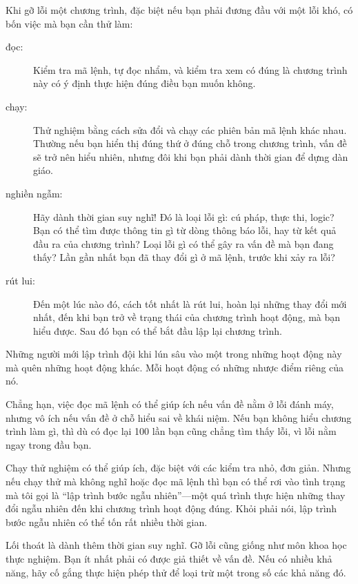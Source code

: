 \documentclass[12pt]{book}
\begin{document}
Khi gỡ lỗi một chương trình, đặc biệt nếu bạn phải đương đầu với
một lỗi khó, có bốn việc mà bạn cần thử làm:

\begin{description}

\item[đọc:] Kiểm tra mã lệnh, tự đọc nhẩm, và kiểm tra xem có đúng
là chương trình này có ý định thực hiện đúng điều bạn muốn không.

\item[chạy:] Thử nghiệm bằng cách sửa đổi và chạy các phiên bản mã lệnh
khác nhau. Thường nếu bạn hiển thị đúng thứ ở đúng chỗ trong chương
trình, vấn đề sẽ trở nên hiểu nhiên, nhưng đôi khi bạn phải dành 
thời gian để dựng dàn giáo.

\item[nghiền ngẫm:] Hãy dành thời gian suy nghĩ! Đó là loại lỗi gì:
cú pháp, thực thi, logic? Bạn có thể tìm được thông tin gì từ dòng
thông báo lỗi, hay từ kết quả đầu ra của chương trình? Loại lỗi gì
có thể gây ra vấn đề mà bạn đang thấy? Lần gần nhất bạn đã thay đổi
gì ở mã lệnh, trước khi xảy ra lỗi?

\item[rút lui:] Đến một lúc nào đó, cách tốt nhất là rút lui, hoàn lại
những thay đổi mới nhất, đến khi bạn trở về trạng thái của chương
trình hoạt động, mà bạn hiểu được. Sau đó bạn có thể bắt đầu lập
lại chương trình.

\end{description}

Những người mới lập trình đội khi lún sâu vào một trong những hoạt
động này mà quên những hoạt động khác. Mỗi hoạt động có những 
nhược điểm riêng của nó.

Chẳng hạn, việc đọc mã lệnh có thể giúp ích nếu vấn đề nằm ở lỗi
đánh máy, nhưng vô ích nếu vấn đề ở chỗ hiểu sai về khái niệm. Nếu
bạn không hiểu chương trình làm gì, thì dù có đọc lại 100 lần bạn
cũng chẳng tìm thấy lỗi, vì lỗi nằm ngay trong đầu bạn.

Chạy thử nghiệm có thể giúp ích, đặc biệt với các kiểm tra nhỏ,
đơn giản. Nhưng nếu chạy thử mà không nghĩ hoặc đọc mã lệnh thì bạn
có thể rơi vào tình trạng mà tôi gọi là ``lập trình bước ngẫu
nhiên''---một quá trình thực hiện những thay đổi ngẫu nhiên đến
khi chương trình hoạt động đúng. Khỏi phải nói, lập trình bước
ngẫu nhiên có thể tốn rất nhiều thời gian.

Lối thoát là dành thêm thời gian suy nghĩ. Gỡ lỗi cũng giống như
môn khoa học thực nghiệm. Bạn ít nhất phải có được giả thiết về
vấn đề. Nếu có nhiều khả năng, hãy cố gắng thực hiện phép thử
để loại trừ một trong số các khả năng đó.
\end{document}
